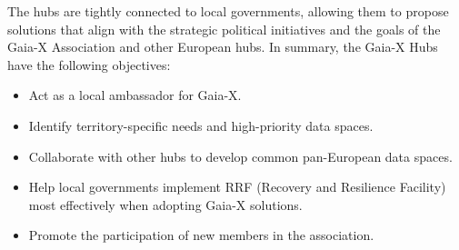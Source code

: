 The hubs are tightly connected to local governments, allowing them to propose solutions that align with the strategic political initiatives and the goals of the Gaia-X Association and other European hubs.
In summary, the Gaia-X Hubs have the following objectives:
\begin{itemize}
    \item Act as a local ambassador for Gaia-X.
    \item Identify territory-specific needs and high-priority data spaces.
    \item Collaborate with other hubs to develop common pan-European data spaces.
    \item Help local governments implement RRF (Recovery and Resilience Facility) most effectively when adopting Gaia-X solutions.
    \item Promote the participation of new members in the association.
\end{itemize}
